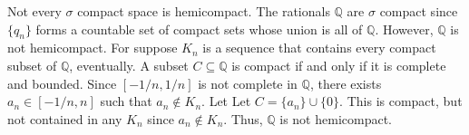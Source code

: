 \documentclass{article}                                                        %
\begin{document}
        \begin{example}
            Not every $\sigma$ compact space is hemicompact. The rationals
            $\mathbb{Q}$ are $\sigma$ compact since $\{q_{n}\}$ forms a
            countable set of compact sets whose union is all of $\mathbb{Q}$.
            However, $\mathbb{Q}$ is not hemicompact. For suppose
            $K_{n}$ is a sequence that contains every compact subset of
            $\mathbb{Q}$, eventually. A subset $C\subseteq\mathbb{Q}$ is compact
            if and only if it is complete and bounded. Since
            $[\minus{1}/n,1/n]$ is not complete in $\mathbb{Q}$, there exists
            $a_{n}\in[\minus{1}/n,n]$ such that $a_{n}\notin{K}_{n}$. Let
            Let $C=\{a_{n}\}\cup\{0\}$. This is compact, but not contained in
            any $K_{n}$ since $a_{n}\notin{K}_{n}$. Thus, $\mathbb{Q}$ is not
            hemicompact.
        \end{example}
\end{document}
